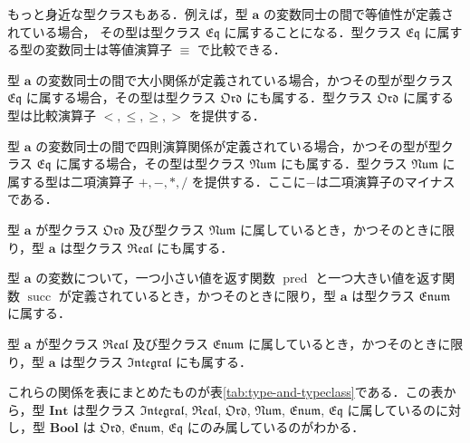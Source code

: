 \documentclass[a4paper,draft]{jsbook}
\newcommand{\mType}[1]{\mathbf{#1}}
\newcommand{\mBoolType}{\mType{Bool}}
\newcommand{\mIntType}{\mType{Int}}
\newcommand{\mSpecialTypeClass}[1]{\mathfrak{#1}} %
\newcommand{\mEqTypeClass}{\mSpecialTypeClass{Eq}}
\newcommand{\mOrdTypeClass}{\mSpecialTypeClass{Ord}}
\newcommand{\mNumTypeClass}{\mSpecialTypeClass{Num}}
\newcommand{\mRealTypeClass}{\mSpecialTypeClass{Real}}
\newcommand{\mEnumTypeClass}{\mSpecialTypeClass{Enum}}
\newcommand{\mIntegralTypeClass}{\mSpecialTypeClass{Integral}}
\DeclareMathOperator{\mPred}{pred}
\DeclareMathOperator{\mSucc}{succ}
\begin{document}
もっと身近な型クラスもある．例えば，型 $\mType{a}$ の変数同士の間で等値性が定義されている場合，
その型は型クラス $\mEqTypeClass$ に属することになる．型クラス $\mEqTypeClass$ に属する型の変数同士は等値演算子 $\equiv$ で比較できる．

型 $\mType{a}$ の変数同士の間で大小関係が定義されている場合，かつその型が型クラス $\mEqTypeClass$ に属する場合，その型は型クラス $\mOrdTypeClass$ にも属する．型クラス $\mOrdTypeClass$ に属する型は比較演算子 $<,\le,\ge,>$ を提供する．

型 $\mType{a}$ の変数同士の間で四則演算関係が定義されている場合，かつその型が型クラス $\mEqTypeClass$ に属する場合，その型は型クラス $\mNumTypeClass$ にも属する．型クラス $\mNumTypeClass$ に属する型は二項演算子 $+,-,*,/$ を提供する．ここに$-$は二項演算子のマイナスである．

型 $\mType{a}$ が型クラス $\mOrdTypeClass$ 及び型クラス $\mNumTypeClass$ に属しているとき，かつそのときに限り，型 $\mType{a}$ は型クラス $\mRealTypeClass$ にも属する．

型 $\mType{a}$ の変数について，一つ小さい値を返す関数 $\mPred$ と一つ大きい値を返す関数 $\mSucc$ が定義されているとき，かつそのときに限り，型 $\mType{a}$ は型クラス $\mEnumTypeClass$ に属する．

型 $\mType{a}$ が型クラス $\mRealTypeClass$ 及び型クラス $\mEnumTypeClass$ に属しているとき，かつそのときに限り，型 $\mType{a}$ は型クラス $\mIntegralTypeClass$ にも属する．

これらの関係を表にまとめたものが表\ref{tab:type-and-typeclass}である．この表から，型 $\mIntType$ は型クラス $\mIntegralTypeClass$, $\mRealTypeClass$, $\mOrdTypeClass$, $\mNumTypeClass$, $\mEnumTypeClass$, $\mEqTypeClass$ に属しているのに対し，型 $\mBoolType$ は $\mOrdTypeClass$, $\mEnumTypeClass$, $\mEqTypeClass$ にのみ属しているのがわかる．
\end{document}
